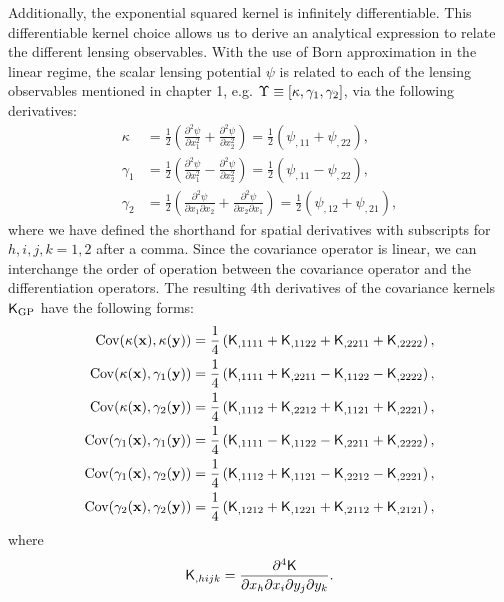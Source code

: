 Additionally, the exponential squared kernel is infinitely differentiable. This
differentiable kernel choice allows us to derive an analytical expression to
relate the different lensing observables.  
With the use of Born approximation in the linear regime, the scalar lensing potential $\psi$ is related to 
each of the lensing observables mentioned in chapter 1, e.g. 
$\Upsilon \equiv [\kappa, \gamma_1, \gamma_2]$, via the following derivatives:
\begin{align}
\kappa &= \frac{1}{2}\left(\frac{\partial^2 \psi}{\partial x_1^2} +
\frac{\partial^2 \psi}{\partial x_2^2 }\right) 
= \frac{1}{2} (\psi_{,11} + \psi_{,22}),\\ 
\gamma_1 
&=\frac{1}{2}\left(\frac{\partial^2 \psi}{\partial x_1^2} - 
\frac{\partial^2 \psi}{\partial x_2^2}\right) 
= \frac{1}{2} (\psi_{,11} - \psi_{,22}), \\
\gamma_2 
&=\frac{1}{2}\left(\frac{\partial^2 \psi}{\partial x_1 \partial
x_2} + \frac{\partial^2 \psi}{\partial x_2 \partial x_1}\right)
= \frac{1}{2} (\psi_{,12} + \psi_{,21}), 
\end{align}
where we have defined the shorthand for spatial derivatives with
subscripts for $h,i,j,k = 1, 2$ after a comma.
Since the covariance operator is linear, we can interchange the order of
operation between the covariance operator and the differentiation operators. 
The resulting 4th derivatives of the covariance
kernels $\mathsf{K}_{\rm GP}$ have the following forms: 
\begin{align}
	\label{eq:kernel_derivatives1}
	\mathrm{Cov} (\kappa(\mathbf{x}), \kappa(\mathbf{y}))
&= \frac{1}{4}\left(
\mathsf{K}_{,1111} + \mathsf{K}_{,1122} + \mathsf{K}_{,2211} + \mathsf{K}_{,2222}
\right), \\
\mathrm{Cov}(\kappa(\mathbf{x}), \gamma_1(\mathbf{y})) &= \frac{1}{4}\left(
\mathsf{K}_{,1111} + \mathsf{K}_{,2211} - \mathsf{K}_{,1122} - \mathsf{K}_{,2222}
\right), \\
\mathrm{Cov}(\kappa(\mathbf{x}), \gamma_2(\mathbf{y})) &= \frac{1}{4}\left(
\mathsf{K}_{,1112} + \mathsf{K}_{,2212} + \mathsf{K}_{,1121} + \mathsf{K}_{,2221}
\right),\\
\mathrm{Cov}(\gamma_1(\mathbf{x}), \gamma_1(\mathbf{y})) &= \frac{1}{4}\left(
\mathsf{K}_{,1111} - \mathsf{K}_{,1122} - \mathsf{K}_{,2211} + \mathsf{K}_{,2222}
\right), \\
\mathrm{Cov}(\gamma_1(\mathbf{x}), \gamma_2(\mathbf{y})) &= \frac{1}{4}\left(
\mathsf{K}_{,1112} + \mathsf{K}_{,1121} - \mathsf{K}_{,2212} - \mathsf{K}_{,2221}
\right), \\
\mathrm{Cov}(\gamma_2(\mathbf{x}), \gamma_2(\mathbf{y})) &= \frac{1}{4}\left(
\mathsf{K}_{,1212} + \mathsf{K}_{,1221} + \mathsf{K}_{,2112} + \mathsf{K}_{,2121}
\right),
	\label{eq:kernel_derivatives2}
\end{align}
where
\begin{equation}
	\mathsf{K}_{,hijk} = \frac{\partial^4 \mathsf{K}}{\partial x_h \partial x_i
	\partial y_j \partial y_k}.
\end{equation}

